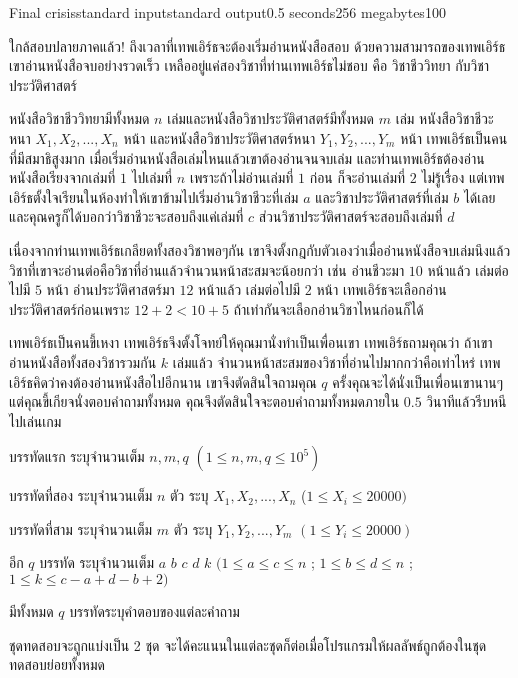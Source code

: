 \documentclass[11pt,a4paper]{article}
\begin{document}
\begin{problem}{Final crisis}{standard input}{standard output}{0.5 seconds}{256 megabytes}{100}

ใกล้สอบปลายภาคแล้ว! ถึงเวลาที่เทพเอิร์ธจะต้องเริ่มอ่านหนังสือสอบ ด้วยความสามารถของเทพเอิร์ธ เขาอ่านหนังสือจบอย่างรวดเร็ว เหลืออยู่แค่สองวิชาที่ท่านเทพเอิร์ธไม่ชอบ คือ วิชาชีววิทยา กับวิชาประวัติศาสตร์

 หนังสือวิชาชีววิทยามีทั้งหมด $n$ เล่มและหนังสือวิชาประวัติศาสตร์มีทั้งหมด $m$ เล่ม หนังสือวิชาชีวะหนา $X_1, X_2, ..., X_n $ หน้า และหนังสือวิชาประวัติศาสตร์หนา $Y_1, Y_2, ..., Y_m$ หน้า เทพเอิร์ธเป็นคนที่มีสมาธิสูงมาก เมื่อเริ่มอ่านหนังสือเล่มไหนแล้วเขาต้องอ่านจนจบเล่ม และท่านเทพเอิร์ธต้องอ่านหนังสือเรียงจากเล่มที่ $1$ ไปเล่มที่ $n$ เพราะถ้าไม่อ่านเล่มที่ $1$ ก่อน ก็จะอ่านเล่มที่ $2$ ไม่รู้เรื่อง แต่เทพเอิร์ธตั้งใจเรียนในห้องทำให้เขาข้ามไปเริ่มอ่านวิชาชีวะที่เล่ม $a$ และวิชาประวัติศาสตร์ที่เล่ม $b$ ได้เลย และคุณครูก็ได้บอกว่าวิชาชีวะจะสอบถึงแค่เล่มที่ $c$ ส่วนวิชาประวัติศาสตร์จะสอบถึงเล่มที่ $d$

เนื่องจากท่านเทพเอิร์ธเกลียดทั้งสองวิชาพอๆกัน เขาจึงตั้งกฎกับตัวเองว่าเมื่ออ่านหนังสือจบเล่มนึงแล้ววิชาที่เขาจะอ่านต่อคือวิชาที่อ่านแล้วจำนวนหน้าสะสมจะน้อยกว่า เช่น อ่านชีวะมา $10$ หน้าแล้ว เล่มต่อไปมี $5$ หน้า อ่านประวัติศาสตร์มา $12$ หน้าแล้ว เล่มต่อไปมี $2$ หน้า เทพเอิร์ธจะเลือกอ่านประวัติศาสตร์ก่อนเพราะ $12+2 < 10+5$ ถ้าเท่ากันจะเลือกอ่านวิชาไหนก่อนก็ได้

เทพเอิร์ธเป็นคนขี้เหงา เทพเอิร์ธจึงตั้งโจทย์ให้คุณมานั่งทำเป็นเพื่อนเขา เทพเอิร์ธถามคุณว่า ถ้าเขาอ่านหนังสือทั้งสองวิชารวมกัน $k$ เล่มแล้ว จำนวนหน้าสะสมของวิชาที่อ่านไปมากกว่าคือเท่าไหร่ เทพเอิร์ธคิดว่าคงต้องอ่านหนังสือไปอีกนาน เขาจึงตัดสินใจถามคุณ $q$ ครั้งคุณจะได้นั่งเป็นเพื่อนเขานานๆ แต่คุณขี้เกียจนั่งตอบคำถามทั้งหมด คุณจึงตัดสินใจจะตอบคำถามทั้งหมดภายใน $0.5$ วินาทีแล้วรีบหนีไปเล่นเกม


\InputFile
บรรทัดแรก ระบุจำนวนเต็ม $ n,m,q$ $( 1\leq n,m,q\leq10^5)$

บรรทัดที่สอง ระบุจำนวนเต็ม $n$ ตัว ระบุ $X_1, X_2, ..., X_n$ ($1\leq X_i\leq20000
)$

บรรทัดที่สาม ระบุจำนวนเต็ม $m$ ตัว ระบุ $Y_1,Y_2,...,Y_m$ $(1\leq Y_i\leq 20000)$

อีก $q$ บรรทัด ระบุจำนวนเต็ม $a$ $b$ $c$ $d$ $k$ $(1\leq a\leq c\leq n $ ; $1\leq b\leq d\leq n $ ; $ 1\leq k\leq c-a+d-b+2)$


\OutputFile
มีทั้งหมด $q$ บรรทัดระบุคำตอบของแต่ละคำถาม

\Scoring
ชุดทดสอบจะถูกแบ่งเป็น 2 ชุด จะได้คะแนนในแต่ละชุดก็ต่อเมื่อโปรแกรมให้ผลลัพธ์ถูกต้องในชุดทดสอบย่อยทั้งหมด


\end{problem}
\end{document}
